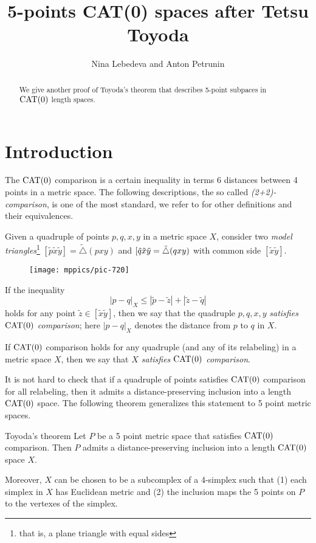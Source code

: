 \documentclass{article}
\begin{document}
\title{5-points CAT(0) spaces after  Tetsu Toyoda}
\author{Nina Lebedeva and Anton Petrunin}
\date{}
\maketitle
\begin{abstract}
We give another proof of Toyoda's theorem that describes 5-point subpaces in $\mathrm{CAT}(0)$ length spaces.
\end{abstract}

\section{Introduction}

The $\mathrm{CAT}(0)$ comparison is a certain inequality in terms 6 distances between 4 points in a metric space.
The following descriptions, the so called \emph{(2+2)-comparison}, is one of the most standard,
we refer to \cite{alexander-kapovitch-petrunin} for other definitions and their equivalences.

Given a quadruple of points $p,q,x,y$ in a metric space $X$,
consider two \emph{model triangles}\footnote{that is, a plane triangle with equal sides}
$[\tilde p\tilde x\tilde y]=\tilde\triangle(pxy)$ 
and 
$[\tilde q\tilde x\tilde y\z=\tilde\triangle(qxy)$ with common side $[\tilde x\tilde y]$.

\begin{wrapfigure}{r}{25mm}
\vskip-4mm
\centering
\texttt{[image: mppics/pic-720]}
\end{wrapfigure}

If the inequality
\[|p-q|_X\le |\tilde p-\tilde z|+|\tilde z-\tilde q|\]
holds for any point $\tilde z\in [\tilde x\tilde y]$, then we say that 
the quadruple $p,q,x,y$ \emph{satisfies $\mathrm{CAT}(0)$ comparison};
here $|p-q|_X$ denotes the distance from $p$ to $q$ in $X$.

If $\mathrm{CAT}(0)$ comparison holds for any quadruple (and any of its relabeling) in a metric space $X$,
then we say that \emph{$X$ satisfies $\mathrm{CAT}(0)$ comparison}.


It is not hard to check that if a quadruple of points satisfies $\mathrm{CAT}(0)$ comparison for all relabeling,
then it admits a distance-preserving inclusion into a length $\mathrm{CAT}(0)$ space.
The following theorem generalizes this statement to 5 point metric spaces.

\begin{thm}{Toyoda's theorem}
Let $P$ be a 5 point metric space that satisfies $\mathrm{CAT}(0)$ comparison.
Then $P$ admits a distance-preserving inclusion into a length $\mathrm{CAT}(0)$ space $X$.

Moreover,
$X$ can be chosen to be a subcomplex of a 4-simplex such that (1) each simplex in $X$ has Euclidean metric and (2) the inclusion maps the 5 points on $P$ to the vertexes of the simplex.
\end{thm}
\end{document}
